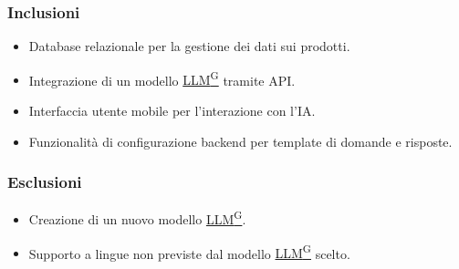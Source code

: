 \documentclass{article}
\begin{document}
        \subsubsection{Inclusioni}
        \begin{itemize}
            \item Database relazionale per la gestione dei dati sui prodotti.
            \item Integrazione di un modello \href{https://code7crusaders.github.io/docs/RTB/documentazione_interna/glossario.html#llm-large-language-model}{LLM\textsuperscript{G}} tramite API.
            \item Interfaccia utente mobile per l'interazione con l'IA.
            \item Funzionalità di configurazione backend per template di domande e risposte.
        \end{itemize}
        \subsubsection{Esclusioni}
        \begin{itemize}
            \item Creazione di un nuovo modello \href{https://code7crusaders.github.io/docs/RTB/documentazione_interna/glossario.html#llm-large-language-model}{LLM\textsuperscript{G}}.
            \item Supporto a lingue non previste dal modello \href{https://code7crusaders.github.io/docs/RTB/documentazione_interna/glossario.html#llm-large-language-model}{LLM\textsuperscript{G}} scelto.
        \end{itemize}
\end{document}
